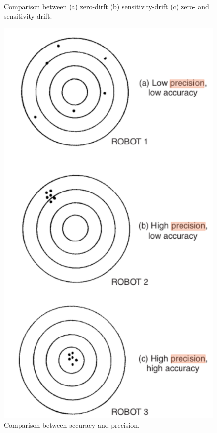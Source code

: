 \documentclass[a4paper,11pt,dvipsnames]{book}
\begin{document}
\begin{figure}[h!]\label{fig:comparison}
   
    \label{fig:zdrift}\hfill
    \label{fig:sdrift}\\
   \label{fig:zsdrift}\hfill
  \caption{ Comparison between (a) zero-dirft (b) sensitivity-drift (c) zero- and sensitivity-drift.} 
\end{figure}

\begin{figure}[h!]\label{fig:comparison}
  \includegraphics[width=0.40\linewidth]{acc_precision}
  \caption{ Comparison between accuracy and precision.} 
\end{figure}
\end{document}
